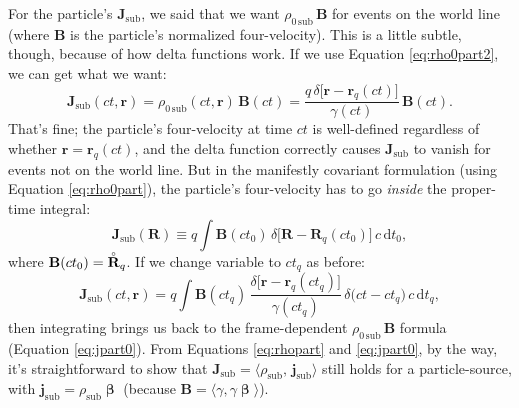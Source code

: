 \documentclass[12pt]{article}
\renewcommand{\mathring}[1]{\accentset{\circ}{#1}}
\renewcommand{\vv}[1]{\mathbf{#1}}
\newcommand{\dd}[1]{\mathrm{d}#1}
\newcommand{\vvbeta}{\bm{\upbeta}}
\begin{document}
For the particle's $\vv J_{\mathrm{sub}}$, we said that we want $\rho_{0 \, \mathrm{sub}} \, \vv B$ for events on the world line (where $\vv B$ is the particle's normalized four-velocity). This is a little subtle, though, because of how delta functions work. If we use Equation \ref{eq:rho0part2}, we can get what we want:
\begin{equation}\label{eq:jpart0}
\vv J_{\mathrm{sub}} (ct, \vv r) = \rho_{0 \, \mathrm{sub}} (ct, \vv r) \, \vv B (ct) = \dfrac{q \, \delta \big[ \vv r - \vv r_q (ct) \big]}{\gamma (ct)} \, \vv B (ct) .
\end{equation}
That's fine; the particle's four-velocity at time $ct$ is well-defined regardless of whether $\vv r = \vv r_q(ct)$, and the delta function correctly causes $\vv J_{\mathrm{sub}}$ to vanish for events not on the world line. But in the manifestly covariant formulation (using Equation \ref{eq:rho0part}), the particle's four-velocity has to go \emph{inside} the proper-time integral:
\begin{equation}\label{eq:jpart}
\vv J_{\mathrm{sub}} (\vv R) \equiv q \int \vv B(ct_0) \, \delta \big[ \vv R - \vv R_q (ct_0) \big] \, c \, \dd t_0 ,
\end{equation}
where $\vv B (ct_0) = \mathring{\vv R}_q$. If we change variable to $ct_q$ as before:
\begin{equation*}
\vv J_{\mathrm{sub}} (ct, \vv r) = q \int \vv B(ct_q) \, \dfrac{\delta \big[ \vv r - \vv r_q (ct_q) \big]}{\gamma (ct_q)} \, \delta \big( ct - ct_q \big) \, c \, \dd t_q ,
\end{equation*}
then integrating brings us back to the frame-dependent $\rho_{0 \, \mathrm{sub}} \, \vv B$ formula (Equation \ref{eq:jpart0}). From Equations \ref{eq:rhopart} and \ref{eq:jpart0}, by the way, it's straightforward to show that $\vv J_{\mathrm{sub}} = \langle \rho_{\mathrm{sub}}, \, \vv j_{\mathrm{sub}} \rangle$ still holds for a particle-source, with $\vv j_{\mathrm{sub}} = \rho_{\mathrm{sub}} \vvbeta$ (because $\vv B = \langle \gamma, \gamma \vvbeta \rangle$).
\end{document}
